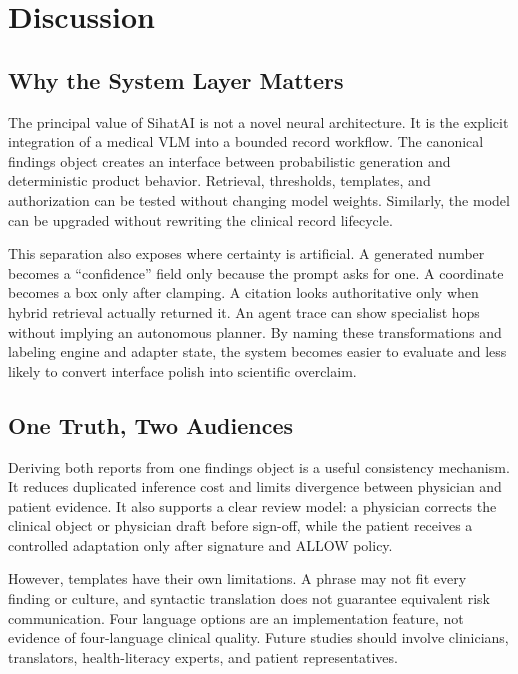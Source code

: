 \documentclass[conference]{IEEEtran}
\begin{document}
\section{Discussion}

\subsection{Why the System Layer Matters}

The principal value of SihatAI is not a novel neural architecture. It is the explicit integration of a medical VLM into a bounded record workflow. The canonical findings object creates an interface between probabilistic generation and deterministic product behavior. Retrieval, thresholds, templates, and authorization can be tested without changing model weights. Similarly, the model can be upgraded without rewriting the clinical record lifecycle.

This separation also exposes where certainty is artificial. A generated number becomes a ``confidence'' field only because the prompt asks for one. A coordinate becomes a box only after clamping. A citation looks authoritative only when hybrid retrieval actually returned it. An agent trace can show specialist hops without implying an autonomous planner. By naming these transformations and labeling engine and adapter state, the system becomes easier to evaluate and less likely to convert interface polish into scientific overclaim.

\subsection{One Truth, Two Audiences}

Deriving both reports from one findings object is a useful consistency mechanism. It reduces duplicated inference cost and limits divergence between physician and patient evidence. It also supports a clear review model: a physician corrects the clinical object or physician draft before sign-off, while the patient receives a controlled adaptation only after signature and ALLOW policy.

However, templates have their own limitations. A phrase may not fit every finding or culture, and syntactic translation does not guarantee equivalent risk communication. Four language options are an implementation feature, not evidence of four-language clinical quality. Future studies should involve clinicians, translators, health-literacy experts, and patient representatives.
\end{document}
